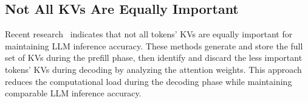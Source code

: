 


\subsection{Not All KVs Are Equally Important}
Recent research~\cite{h2o-nips23, infinigen-osdi24, flexgen-icml23, scissorhands-nips23} indicates that not all tokens' KVs are equally important for maintaining LLM inference accuracy. These methods generate and store the full set of KVs during the prefill phase, then  identify and discard the less important tokens' KVs during decoding by analyzing the attention weights. This approach reduces the computational load during the decoding phase while maintaining comparable LLM inference accuracy.

